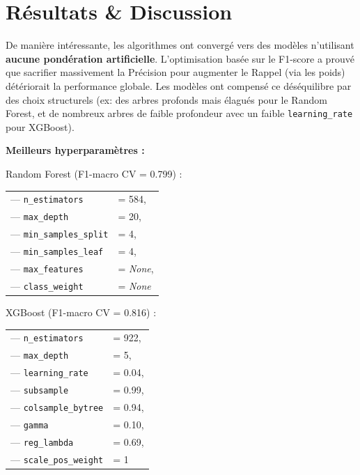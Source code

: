 \documentclass[10pt, a4paper]{article}
\begin{document}
\section{Résultats \& Discussion}

De manière intéressante, les algorithmes ont convergé vers des modèles n'utilisant \textbf{aucune pondération artificielle}. L'optimisation basée sur le F1-score a prouvé que sacrifier massivement la Précision pour augmenter le Rappel (via les poids) détériorait la performance globale. Les modèles ont compensé ce déséquilibre par des choix structurels (ex: des arbres profonds mais élagués pour le Random Forest, et de nombreux arbres de faible profondeur avec un faible \texttt{learning\_rate} pour XGBoost).

\medskip
\noindent\textbf{Meilleurs hyperparamètres :}\\
\begin{minipage}[t]{0.48\textwidth}
    \noindent Random Forest (F1-macro CV = 0.799) : \\
    \begin{tabular}{ll}
    --- \texttt{n\_estimators}       & = 584, \\
    --- \texttt{max\_depth}          & = 20, \\
    --- \texttt{min\_samples\_split} & = 4, \\
    --- \texttt{min\_samples\_leaf}  & = 4, \\
    --- \texttt{max\_features}       & = \textit{None}, \\
    --- \texttt{class\_weight}       & = \textit{None} \\
	\end{tabular}
\end{minipage}
\hfill
\begin{minipage}[t]{0.48\textwidth}
    \noindent XGBoost (F1-macro CV = 0.816) : \\
	\begin{tabular}{ll}
	--- \texttt{n\_estimators}       & = 922, \\
	--- \texttt{max\_depth}          & = 5, \\
	--- \texttt{learning\_rate}      & = 0.04, \\
	--- \texttt{subsample}           & = 0.99, \\
	--- \texttt{colsample\_bytree}   & = 0.94, \\
	--- \texttt{gamma}               & = 0.10, \\
	--- \texttt{reg\_lambda}         & = 0.69, \\
	--- \texttt{scale\_pos\_weight}  & = 1 \\
	\end{tabular}
\end{minipage}
\end{document}
